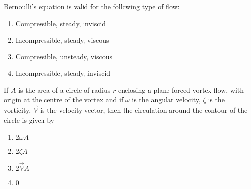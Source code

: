 \newpage
    \item Bernoulli's equation is valid for the following type of flow:
    \begin{multicols}{2}
    \begin{enumerate}
        \item Compressible, steady, inviscid
        \item Incompressible, steady, viscous
        \item Compressible, unsteady, viscous
        \item Incompressible, steady, inviscid
    \end{enumerate}
    \end{multicols}
\bigskip
    \item If $A$ is the area of a circle of radius $r$ enclosing a plane forced vortex flow, with origin at the centre of the vortex and if $\omega$ is the angular velocity, $\zeta$ is the vorticity, $\vec{V}$ is the velocity vector, then the circulation around the contour of the circle is given by
    \begin{multicols}{4}
    \begin{enumerate}
        \item $2 \omega A$
        \item $2 \zeta A$
        \item $2 \vec{V} A$
        \item 0
    \end{enumerate}
    \end{multicols}
